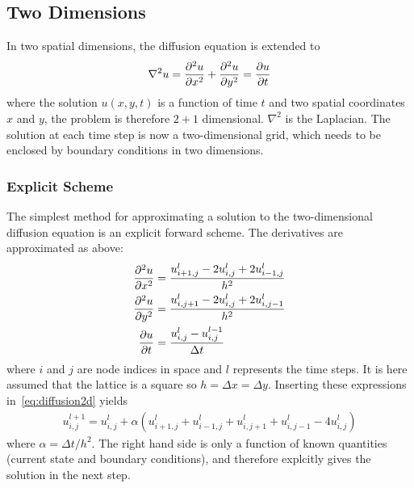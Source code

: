 \documentclass[aps,reprint]{revtex4-1}
\begin{document}
\subsection{Two Dimensions}
In two spatial dimensions, the diffusion equation is extended to
\begin{align} \label{eq:diffusion2d}
  \nabla^2 u = \pdv[2]{u}{x} + \pdv[2]{u}{y} = \pdv{u}{t}
\end{align}
where the solution $u(x,y,t)$ is a function of time $t$ and two spatial coordinates $x$ and $y$,
the problem is therefore $2 + 1$ dimensional. $\nabla^2$ is the Laplacian. The solution at
each time step is now a two-dimensional grid, which needs to be enclosed by boundary
conditions in two dimensions.
\subsubsection{Explicit Scheme}
The simplest method for approximating a solution to the two-dimensional diffusion
equation is an explicit forward scheme. The derivatives are approximated as above:
\begin{align*}
  \pdv[2]{u}{x} &= \frac{u^l_{i+1,j} - 2u^l_{i,j} + 2u^l_{i-1,j}}{h^2} \\
  \pdv[2]{u}{y} &= \frac{u^l_{i,j+1} - 2u^l_{i,j} + 2u^l_{i,j-1}}{h^2} \\
  \pdv{u}{t} &= \frac{u^l_{i,j} - u^{l-1}_{i,j}}{\Delta{t}}
\end{align*}
where $i$ and $j$ are node indices in space and $l$ represents the time steps. It
is here assumed that the lattice is a square so $h = \Delta{x} = \Delta{y}$. Inserting
these expressions in~\ref{eq:diffusion2d} yields
\begin{align*}
  u_{i,j}^{l+1} = u_{i,j}^l + \alpha (u^l_{i+1,j} + u^l_{i-1,j} + u_{i,j+1}^l + u_{i,j-1}^l - 4 u^l_{i,j})
\end{align*}
where $\alpha = \Delta{t}/h^2$. The right hand side is only a function of known
quantities (current state and boundary conditions), and therefore explcitly gives
the solution in the next step.
\end{document}
